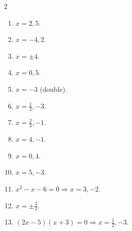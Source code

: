 \documentclass[11pt]{article}
\begin{document}
\begin{keybox}
\begin{multicols}{2}
\small
\begin{enumerate}[leftmargin=*,itemsep=3pt]
  \item $x=2,5$.
  \item $x=-4,2$.
  \item $x=\pm4$.
  \item $x=0,5$.
  \item $x=-3$ (double).
  \item $x=\tfrac12,-3$.
  \item $x=\tfrac23,-1$.
  \item $x=4,-1$.
  \item $x=0,4$.
  \item $x=5,-3$.
  \item $x^2-x-6=0\Rightarrow x=3,-2$.
  \item $x=\pm\tfrac32$.
  \item $(2x-5)(x+3)=0\Rightarrow x=\tfrac52,-3$.
\end{enumerate}
\end{multicols}
\end{keybox}
\end{document}
